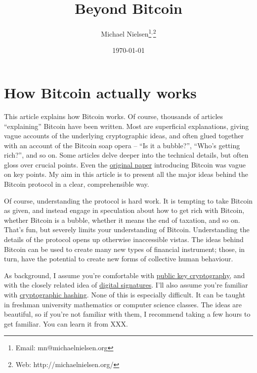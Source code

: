 \documentclass[12pt]{book}
\newcommand{\link}[2]{\href{#1}{#2}}
\begin{document}
\title{Beyond Bitcoin}
\author{Michael Nielsen\thanks{Email: mn@michaelnielsen.org}$^{,}$\thanks{Web: http://michaelnielsen.org/}}
\date{\today}

\maketitle

\pagestyle{headings}

\tableofcontents

\chapter{How Bitcoin actually works}

%
%
This article explains how Bitcoin works.  Of course, thousands of
articles ``explaining'' Bitcoin have been written.  Most are
superficial explanations, giving vague accounts of the underlying
cryptographic ideas, and often glued together with an account of the
Bitcoin soap opera -- ``Is it a bubble?'', ``Who's getting rich?'',
and so on.  Some articles delve deeper into the technical details, but
often gloss over crucial points.  Even the
\link{http://bitcoin.org/bitcoin.pdf}{original paper} introducing
Bitcoin was vague on key points.  My aim in this article is to present
all the major ideas behind the Bitcoin protocol in a clear,
comprehensible way.

%
%
Of course, understanding the protocol is hard work.  It is tempting to
take Bitcoin as given, and instead engage in speculation about how to
get rich with Bitcoin, whether Bitcoin is a bubble, whether it means
the end of taxation, and so on.  That's fun, but severely limits your
understanding of Bitcoin.  Understanding the details of the protocol
opens up otherwise inaccessible vistas.  The ideas behind Bitcoin can
be used to create many new types of financial instrument; those, in
turn, have the potential to create new forms of collective human
behaviour.  

%
%
As background, I assume you're comfortable with
\link{http://en.wikipedia.org/wiki/Public-key_cryptography}{public key
  cryptography}, and with the closely related idea of
\link{https://en.wikipedia.org/wiki/Digital_signature}{digital
  signatures}.  I'll also assume you're familiar with
\link{https://en.wikipedia.org/wiki/Cryptographic_hash_function}{cryptographic
  hashing}.  None of this is especially difficult.  It can be taught
in freshman university mathematics or computer science classes.  The
ideas are beautiful, so if you're not familiar with them, I recommend
taking a few hours to get familiar.  You can learn it from XXX.
\end{document}
